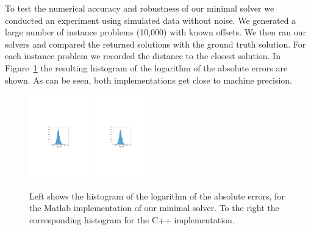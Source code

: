\documentclass{article}
\begin{document}
To test the numerical accuracy and robustness of our minimal solver we conducted an experiment using simulated data without noise. We generated a large number of instance problems (10,000) with known offsets. We then ran our solvers and compared the returned solutions with the ground truth solution. For each instance problem we recorded the distance to the closest solution. In Figure~\ref{fig:f_hist} the resulting histogram of the logarithm of the absolute errors are shown. As can be seen, both implementations get close to machine precision. 
\begin{figure}
\includegraphics[width=0.23\textwidth]{figs/hist_matlabsolver.pdf}
\includegraphics[width=0.23\textwidth]{figs/hist_mexsolver.pdf}
\caption{Left shows the histogram of the logarithm of the absolute errors, for the Matlab implementation of our minimal solver. To the right the corresponding histogram for the C++ implementation.}
\label{fig:f_hist}
\end{figure}
\end{document}
